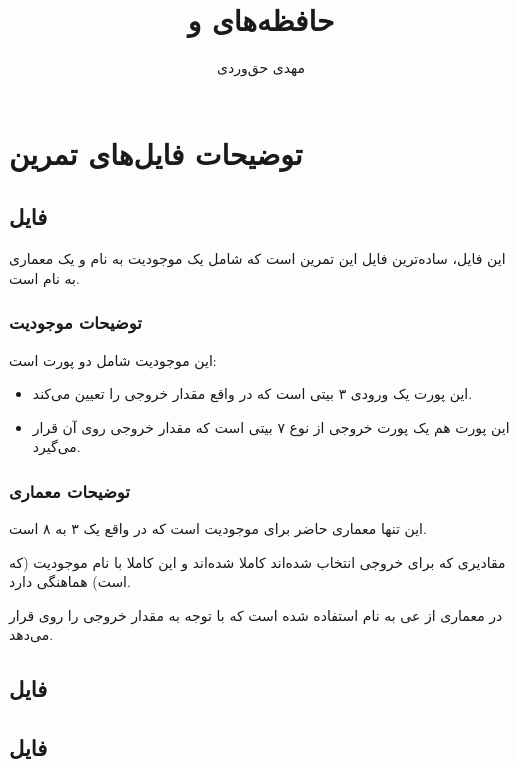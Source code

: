 \documentclass[dvipsnames, svgnames, x11names, a4paper, 11pt]{article}
\title{حافظه‌های \lr{ROM} و \lr{BRAM}}
\author{مهدی حق‌وردی}
\begin{document}
\maketitle
\tableofcontents

\section{توضیحات فایل‌های تمرین}
\subsection{فایل }
این فایل، ساده‌ترین فایل این تمرین است که شامل یک موجودیت به نام
و یک معماری به نام 
است.

\subsubsection{توضیحات موجودیت }
این موجودیت شامل دو پورت است:
\begin{itemize}
\item 
{}

این پورت یک ورودی 
۳ بیتی است که در واقع مقدار خروجی را تعیین می‌کند.

\item 
{}

این پورت هم یک پورت خروجی از نوع 
۷ بیتی است که مقدار خروجی روی آن قرار می‌گیرد.
\end{itemize}

\subsubsection{توضیحات معماری }
این تنها معماری حاضر برای موجودیت 
است که در واقع یک  ۳ به ۸ است.

مقادیری که برای خروجی انتخاب شده‌اند کاملا  شده‌اند و این کاملا با نام موجودیت (که  است) هماهنگی دارد.

در معماری از 
عی به نام 
استفاده شده است که با توجه به مقدار 
خروجی را روی 
قرار می‌دهد.
\subsection{فایل }

\subsection{فایل }
\end{document}
